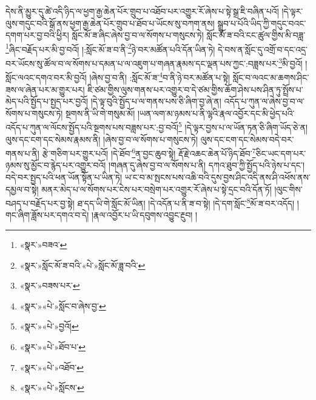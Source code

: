 དེས་ནི་མྱུར་དུ་ཚེ་འདི་ཉིད་ལ་ཕྱག་རྒྱ་ཆེན་པོར་གྲུབ་པ་འཐོབ་པར་འགྱུར་རོ་ཞེས་པ་སྟེ་སྒྲ་ཇི་བཞིན་པའོ། །དེ་ལྟར་ལུས་གདུང་བའི་སྒོ་ནས་ཕྱག་རྒྱ་ཆེན་པོར་གྲུབ་པ་ཐོབ་པ་ཡོངས་སུ་བཀག་ནས། སྒྲུབ་པ་པོའི་ཡིད་ཀྱི་གདུང་བའང་དགག་པར་བྱ་བའི་ཕྱིར། སློང་མོ་ཟ་ཞིང་ཞེས་བྱ་བ་ལ་སོགས་པ་གསུངས་ཏེ། སློང་མོ་ཟ་བའི་ངང་ཚུལ་གྱིས་མི་བཟླ་\footnote{«སྣར་»བཟའ་}ཞིང་བརྗོད་པར་མི་བྱ་བའོ། །:སློང་མོ་ཟ་བ་ནི་\footnote{«སྣར་»སློང་མོ་ཟ་བའི་«པེ་»སློང་མོ་ཟླ་བའི་}ཉེ་བར་མཚོན་པའི་དོན་ཡིན་ཏེ། དེ་བས་ན་སློང་དུ་འགྲོ་བ་དང་འདྲ་བར་ཡོངས་སུ་ཚོལ་བ་ལ་སོགས་པ་དམན་པ་ལ་འཇུག་པ་གཞན་རྣམས་དང་ལྡན་པས་ཀྱང་:བཟླས་པར་\footnote{«སྣར་»བཟས་པར་}མི་བྱའོ། །སློང་ལའང་དགའ་བར་མི་བྱའོ། །ཞེས་བྱ་བ་ནི། :སློང་མོ་ཟ་\footnote{«སྣར་»«པེ་»སློང་བ་ཞེས་བྱ་}བ་ནི་ཉེ་བར་མཚོན་པ་སྟེ། སློང་བ་ལའང་མ་ཆགས་ཤིང་ཟས་ལ་ཞེན་པར་མ་གྱུར་པར། ཇི་ཙམ་གྱིས་ལུས་གནས་པར་འགྱུར་བ་དེ་ཙམ་གྱིས་ཆོག་ཤེས་པས་ཤིན་ཏུ་སྤྲོས་པ་མེད་པའི་སྤྱོད་པ་སྤྱད་པར་བྱའོ། །དེ་ལྟ་བུའི་སྤྱོད་པ་ལ་གནས་པས་ཅི་ཞིག་བྱ་ཞེ་ན། འདོད་པ་ཀུན་ལ་ཞེས་བྱ་བ་ལ་སོགས་པ་གསུངས་ཏེ། སྔགས་ནི་ཡི་གེ་གསུམ་མོ། །ཡན་ལག་མ་ཉམས་པ་ནི་ལྷའི་རྣལ་འབྱོར་དང་མི་ཕྱེད་པའི་འདོད་པ་ཀུན་ལ་ལོངས་སྤྱོད་པའི་སྔགས་པས་བཟླས་པར་:བྱ་བའོ།\footnote{«སྣར་»«པེ་»བྱའོ།} །དེ་ལྟར་བྱས་པ་ལ་ཡོན་ཏན་ཅི་ཞིག་ཡོད་ཅེ་ན། ལུས་དང་ངག་དང་སེམས་རྣམས་ནི། །ཞེས་བྱ་བ་ལ་སོགས་པ་གསུངས་ཏེ། ལུས་དང་ངག་དང་སེམས་བདེ་བར་གནས་པ་ནི། རྩེ་གཅིག་པར་གྱུར་པའོ། །དེ་ཐོབ་\footnote{«སྣར་»«པེ་»ཐོབ་པ་}ན་བྱང་ཆུབ་སྟེ། རྡོ་རྗེ་འཆང་ཆེན་པོ་ཉིད་ཐོབ་\footnote{«སྣར་»«པེ་»འཐོབ་}ཅིང་ཡང་དག་པར་ཉམས་སུ་མྱོང་བ་རྙེད་པར་འགྱུར་བའོ། །གཞན་དུ་ཞེས་བྱ་བ་ལ་སོགས་པ་ནི། དཀའ་ཐུབ་ཀྱི་སྤྱོད་པའི་ཉེས་པ་དང་། བདེ་བར་སྤྱད་པའི་ཕན་ཡོན་སྟོན་པ་ཡིན་ཏེ། ཡ་ང་བ་མ་སྤངས་པས་འཆི་བའི་དུས་བྱས་ཤིང་འདི་ནས་ཤི་འཕོས་ནས་དམྱལ་བ་སྟེ། མནར་མེད་པ་ལ་སོགས་པར་ངེས་པར་བསྲེག་པར་འགྱུར་རོ་ཞེས་པ་སྟེ་དྲང་བའི་དོན་ཏོ། །ལུང་གིས་བཤད་པ་བརྗོད་པར་བྱ་སྟེ། ཐ་དད་ཡི་གེ་སློང་མོ་ཡིན། །དེ་འདོན་པ་ནི་ཟ་བ་སྟེ། །དེ་དག་སློང་\footnote{«སྣར་»«པེ་»སློངས་}མོ་ཟ་བར་འདོད། །གང་ཞིག་ཟློས་པར་དགའ་བ་དེ། །རྣལ་འབྱོར་པ་ཡི་དབུགས་འབྱུང་རྔུབ། །

